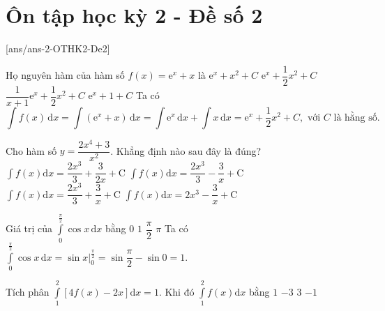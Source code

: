 \section{Ôn tập học kỳ 2 - Đề số 2}
[ans/ans-2-OTHK2-De2]
\caulc

\begin{ex}%
	Họ nguyên hàm của hàm số $f(x)=\mathrm{e}^x + x$ là
	\choice
	{$\mathrm{e}^x + x^2 + C$}
	{\True $\mathrm{e}^x + \dfrac{1}{2}x^2 + C$}
	{$\dfrac{1}{x  + 1}\mathrm{e}^x + \dfrac{1}{2}x^2 + C$}
	{$\mathrm{e}^x + 1 + C$}
	\loigiai
	{
		Ta có
		$$\displaystyle\int f(x) \mathrm{\,d}x = \displaystyle\int(\mathrm{e}^x+x)\mathrm{\,d}x = \displaystyle\int \mathrm{e}^x \mathrm{\,d}x + \displaystyle\int x \mathrm{\,d}x = \mathrm{e}^x+\dfrac{1}{2}x^2+C, \text{ với } C \text{ là hằng số}.$$
	}
\end{ex}
\begin{ex}%
	Cho hàm số $y = \dfrac{2x^4 + 3}{x^2}$. Khẳng định nào sau đây là đúng?
	\choice
	{$ \displaystyle\int\limits f(x)\mathrm{d}x = \dfrac{2x^3}{3} + \dfrac{3}{2x} + \mathrm{C} $}
	{\True $ \displaystyle\int\limits f(x)\mathrm{d}x = \dfrac{2x^3}{3} - \dfrac{3}{x} + \mathrm{C} $}
	{$ \displaystyle\int\limits f(x)\mathrm{d}x = \dfrac{2x^3}{3} + \dfrac{3}{x} + \mathrm{C} $}
	{$ \displaystyle\int\limits f(x)\mathrm{d}x = 2x^3 - \dfrac{3}{x} + \mathrm{C} $}
\end{ex}
\begin{ex}%
	Giá trị của $\displaystyle\int\limits_0^{\frac{\pi}{2}} \cos x\mathrm{\,d}x$ bằng
	\choice
	{$0$}
	{\True $1$}
	{$\dfrac{\pi}{2}$}
	{$\pi$}
	\loigiai
	{
		Ta có $\displaystyle\int\limits_0^{\frac{\pi}{2}} \cos x\mathrm{\,d}x = \sin x\Big|_0^{\frac{\pi}{2}} = \sin\dfrac{\pi}{2}-\sin 0 = 1$.
	}
\end{ex}
\begin{ex}%
	Tích phân $ \displaystyle\int\limits_{1}^{2}[4f(x) - 2x]\mathrm{d}x = 1$. Khi đó $ \displaystyle\int\limits_{1}^{2}f(x)\mathrm{d}x$ bằng
	\choice
	{\True $ 1$}
	{$ - 3 $}
	{$ 3 $}
	{$ -1$}
\end{ex}
